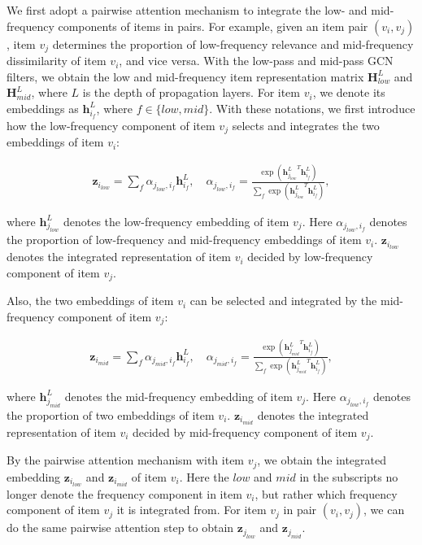 \documentclass[letterpaper]{article} %
\begin{document}
We first adopt a pairwise attention mechanism to integrate the low- and mid-frequency components of items in pairs. For example, given an item pair $(v_i, v_j)$, item $v_j$ determines the proportion of low-frequency relevance and mid-frequency dissimilarity of item $v_i$, and vice versa.
With the low-pass and mid-pass GCN filters, we obtain the low and mid-frequency item representation matrix $\mathbf{H}_{low}^L$ and  $\mathbf{H}_{mid}^L$, where $L$ is the depth of propagation layers. For item $v_i$, we denote its embeddings as $\mathbf{h}_{i_f}^L$, where $f \in \{low,mid\}$. With these notations, we first introduce how the low-frequency component of item $v_j$ selects and integrates the two embeddings of item $v_i$:
\begin{small}
\begin{gather}
   \mathbf{z}_{i_{low}}=\sum_{f}\alpha_{j_{low},i_{f}}\mathbf{{h}}_{i_f}^{L}, \quad
   \alpha_{j_{low},i_f}=\frac{\exp({\mathbf{h}_{j_{low}}^{L}}^T\mathbf{h}_{i_f}^{L})}{\sum_f\exp({\mathbf{h}_{j_{low}}^{L}}^T\mathbf{h}_{i_f}^{L})},
   \label{eq:pair_low}
\end{gather}
\end{small}
where $\mathbf{h}_{j_{low}}^L$ denotes the low-frequency embedding of item $v_j$. Here $\alpha_{j_{low},i_f}$ denotes the proportion of low-frequency and mid-frequency embeddings of item $v_i$. $\mathbf{z}_{i_{low}}$ denotes the integrated representation of item $v_i$ decided by low-frequency component of item $v_j$.


Also, the two embeddings of item $v_i$ can be selected and integrated by the mid-frequency component of item $v_j$:
\begin{small}
\begin{gather}
   \mathbf{z}_{i_{mid}}=\sum_{f}\alpha_{j_{mid},i_{f}}\mathbf{{h}}_{i_f}^{L}, \quad
   \alpha_{j_{mid},i_f}=\frac{\exp({\mathbf{h}_{j_{mid}}^{L}}^T\mathbf{h}_{i_f}^{L})}{\sum_f\exp({\mathbf{h}_{j_{mid}}^{L}}^T\mathbf{h}_{i_f}^{L})},
   \label{eq:pair_mid}
\end{gather}
\end{small}
where $\mathbf{h}_{j_{mid}}^L$ denotes the mid-frequency embedding of item $v_j$. Here $\alpha_{j_{low},i_f}$ denotes the proportion of two embeddings of item $v_i$. $\mathbf{z}_{i_{mid}}$ denotes the integrated representation of item $v_i$ decided by mid-frequency component of item $v_j$.


By the pairwise attention mechanism with item $v_j$, we obtain the integrated embedding $\mathbf{z}_{i_{low}}$ and $\mathbf{z}_{i_{mid}}$ of item $v_i$. Here the $low$ and $mid$ in the subscripts no longer denote the frequency component in item $v_i$, but rather which frequency component of item $v_j$ it is integrated from. For item $v_j$ in pair $(v_i, v_j)$, we can do the same pairwise attention step to obtain $\mathbf{z}_{j_{low}}$ and $\mathbf{z}_{j_{mid}}$.
\end{document}
